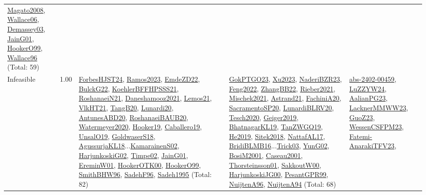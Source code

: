 {\begin{longtable}{p{3cm}r>{\raggedright\arraybackslash}p{6cm}>{\raggedright\arraybackslash}p{6cm}>{\raggedright\arraybackslash}p{8cm}}
\hyperref[detail:Magato2008]{Magato2008}, \hyperref[detail:Wallace06]{Wallace06}, \hyperref[detail:Demassey03]{Demassey03}, \hyperref[detail:JainG01]{JainG01}, \hyperref[detail:HookerO99]{HookerO99}, \hyperref[detail:Wallace96]{Wallace96} (Total: 59)\\
\index{Infeasible}\index{Concepts!Infeasible}Infeasible &  1.00 & \hyperref[detail:ForbesHJST24]{ForbesHJST24}, \hyperref[detail:Ramos2023]{Ramos2023}, \hyperref[detail:EmdeZD22]{EmdeZD22}, \hyperref[detail:BulckG22]{BulckG22}, \hyperref[detail:KoehlerBFFHPSSS21]{KoehlerBFFHPSSS21}, \hyperref[detail:RoshanaeiN21]{RoshanaeiN21}, \hyperref[detail:Daneshamooz2021]{Daneshamooz2021}, \hyperref[detail:Lemos21]{Lemos21}, \hyperref[detail:VlkHT21]{VlkHT21}, \hyperref[detail:TangB20]{TangB20}, \hyperref[detail:Lunardi20]{Lunardi20}, \hyperref[detail:AntunesABD20]{AntunesABD20}, \hyperref[detail:RoshanaeiBAUB20]{RoshanaeiBAUB20}, \hyperref[detail:Watermeyer2020]{Watermeyer2020}, \hyperref[detail:Hooker19]{Hooker19}, \hyperref[detail:Caballero19]{Caballero19}, \hyperref[detail:UnsalO19]{UnsalO19}, \hyperref[detail:GoldwaserS18]{GoldwaserS18}, \hyperref[detail:AgussurjaKL18]{AgussurjaKL18}...\hyperref[detail:KamarainenS02]{KamarainenS02}, \hyperref[detail:HarjunkoskiG02]{HarjunkoskiG02}, \hyperref[detail:Timpe02]{Timpe02}, \hyperref[detail:JainG01]{JainG01}, \hyperref[detail:EreminW01]{EreminW01}, \hyperref[detail:HookerOTK00]{HookerOTK00}, \hyperref[detail:HookerO99]{HookerO99}, \hyperref[detail:SmithBHW96]{SmithBHW96}, \hyperref[detail:SadehF96]{SadehF96}, \hyperref[detail:Sadeh1995]{Sadeh1995} (Total: 82) & \hyperref[detail:GokPTGO23]{GokPTGO23}, \hyperref[detail:Xu2023]{Xu2023}, \hyperref[detail:NaderiBZR23]{NaderiBZR23}, \hyperref[detail:Feng2022]{Feng2022}, \hyperref[detail:ZhangBB22]{ZhangBB22}, \hyperref[detail:Rieber2021]{Rieber2021}, \hyperref[detail:Mischek2021]{Mischek2021}, \hyperref[detail:Astrand21]{Astrand21}, \hyperref[detail:FachiniA20]{FachiniA20}, \hyperref[detail:SacramentoSP20]{SacramentoSP20}, \hyperref[detail:LunardiBLRV20]{LunardiBLRV20}, \hyperref[detail:Tesch2020]{Tesch2020}, \hyperref[detail:Geiger2019]{Geiger2019}, \hyperref[detail:BhatnagarKL19]{BhatnagarKL19}, \hyperref[detail:TanZWGQ19]{TanZWGQ19}, \hyperref[detail:He2019]{He2019}, \hyperref[detail:Sitek2018]{Sitek2018}, \hyperref[detail:NattafAL17]{NattafAL17}, \hyperref[detail:BridiBLMB16]{BridiBLMB16}...\hyperref[detail:Trick03]{Trick03}, \hyperref[detail:YunG02]{YunG02}, \hyperref[detail:BosiM2001]{BosiM2001}, \hyperref[detail:Caseau2001]{Caseau2001}, \hyperref[detail:Thorsteinsson01]{Thorsteinsson01}, \hyperref[detail:SakkoutW00]{SakkoutW00}, \hyperref[detail:HarjunkoskiJG00]{HarjunkoskiJG00}, \hyperref[detail:PesantGPR99]{PesantGPR99}, \hyperref[detail:NuijtenA96]{NuijtenA96}, \hyperref[detail:NuijtenA94]{NuijtenA94} (Total: 68) & \hyperref[detail:abs-2402-00459]{abs-2402-00459}, \hyperref[detail:LuZZYW24]{LuZZYW24}, \hyperref[detail:AalianPG23]{AalianPG23}, \hyperref[detail:LacknerMMWW23]{LacknerMMWW23}, \hyperref[detail:GuoZ23]{GuoZ23}, \hyperref[detail:WessenCSFPM23]{WessenCSFPM23}, \hyperref[detail:Fatemi-AnarakiTFV23]{Fatemi-AnarakiTFV23}, 
\end{longtable}}
